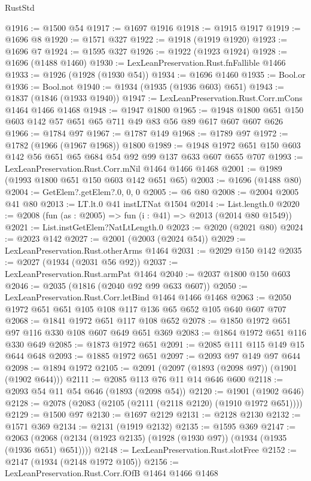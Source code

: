 \begin{lexlean}{RustStd}
\begin{coremodule}
@1916 := @1500 @54
@1917 := @1697 @1916
@1918 := @1915 @1917
@1919 := @1696 @8
@1920 := @1571 @327
@1922 := @1918 (@1919 @1920)
@1923 := @1696 @7
@1924 := @1595 @327
@1926 := @1922 (@1923 @1924)
@1928 := @1696 (@1488 @1460)
@1930 := LexLeanPreservation.Rust.fnFallible @1466
@1933 := @1926 (@1928 (@1930 @54))
@1934 := @1696 @1460
@1935 := Bool.or
@1936 := Bool.not
@1940 := @1934 (@1935 (@1936 @603) @651)
@1943 := @1837 (@1846 (@1933 @1940))
@1947 := LexLeanPreservation.Rust.Corr.mCons @1464 @1466 @1468
@1948 := @1947 @1800
@1965 := @1948 @1800 @651 @150 @603 @142 @57 @651 @65 @711 @49 @83 @56 @89 @617 @607 @607 @626
@1966 := @1784 @97
@1967 := @1787 @149
@1968 := @1789 @97
@1972 := @1782 (@1966 (@1967 @1968)) @1800
@1989 := @1948 @1972 @651 @150 @603 @142 @56 @651 @65 @684 @54 @92 @99 @137 @633 @607 @655 @707
@1993 := LexLeanPreservation.Rust.Corr.mNil @1464 @1466 @1468
@2001 := @1989 (@1993 @1800 @651 @150 @603 @142 @651 @65)
@2003 := @1696 (@1488 @80)
@2004 := GetElem?.getElem?.{0, 0, 0}
@2005 := @6 @80
@2008 := @2004 @2005 @41 @80
@2013 := LT.lt.{0} @41 instLTNat @1504
@2014 := List.length.{0}
@2020 := @2008 (fun (as : @2005) => fun (i : @41) => @2013 (@2014 @80 @1549))
@2021 := List.instGetElem?NatLtLength.{0}
@2023 := @2020 (@2021 @80)
@2024 := @2023 @142
@2027 := @2001 (@2003 (@2024 @54))
@2029 := LexLeanPreservation.Rust.otherArms @1464
@2031 := @2029 @150 @142
@2035 := @2027 (@1934 (@2031 @56 @92))
@2037 := LexLeanPreservation.Rust.armPat @1464
@2040 := @2037 @1800 @150 @603
@2046 := @2035 (@1816 (@2040 @92 @99 @633 @607))
@2050 := LexLeanPreservation.Rust.Corr.letBind @1464 @1466 @1468
@2063 := @2050 @1972 @651 @651 @105 @108 @117 @136 @65 @652 @105 @640 @607 @707
@2068 := @1841 @1972 @651 @117 @108 @652
@2078 := @1850 @1972 @651 @97 @116 @330 @108 @607 @649 @651 @369
@2083 := @1864 @1972 @651 @116 @330 @649
@2085 := @1873 @1972 @651
@2091 := @2085 @111 @115 @149 @15 @644 @648
@2093 := @1885 @1972 @651
@2097 := @2093 @97 @149 @97 @644
@2098 := @1894 @1972
@2105 := @2091 (@2097 (@1893 (@2098 @97)) (@1901 (@1902 @644)))
@2111 := @2085 @113 @76 @11 @14 @646 @600
@2118 := @2093 @54 @11 @54 @646 (@1893 (@2098 @54))
@2120 := @1901 (@1902 @646)
@2128 := @2078 (@2083 (@2105 (@2111 (@2118 @2120) (@1910 @1972 @651))))
@2129 := @1500 @97
@2130 := @1697 @2129
@2131 := @2128 @2130
@2132 := @1571 @369
@2134 := @2131 (@1919 @2132)
@2135 := @1595 @369
@2147 := @2063 (@2068 (@2134 (@1923 @2135) (@1928 (@1930 @97)) (@1934 (@1935 (@1936 @651) @651))))
@2148 := LexLeanPreservation.Rust.slotFree
@2152 := @2147 (@1934 (@2148 @1972 @105))
@2156 := LexLeanPreservation.Rust.Corr.fOfB @1464 @1466 @1468

\end{coremodule}
\end{lexlean}
